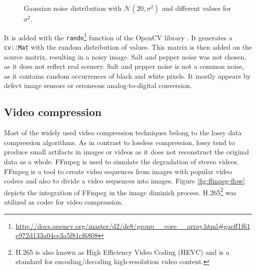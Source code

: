 \begin{figure}[h!]
  \center
  \caption{Gaussian noise distribution with $\mathcal{N}(20,\sigma^2)$ and different values for $\sigma^2$.}
  \label{fig:gaussian}
\end{figure}

\noindent It is added with the \texttt{randn}\footnote{\url{http://docs.opencv.org/master/d2/de8/group__core__array.html\#gaeff1f61e972d133a04ce3a5f81cf6808}} function of the OpenCV library \citep{opencv_library}.
It generates a \texttt{cv::Mat} with the random distribution of values.
This matrix is then added on the source matrix, resulting in a noisy image.
Salt and pepper noise was not chosen, as it does not reflect real scenery.
Salt and pepper noise is not a common noise, as it contains random occurrences of black and white pixels.
It mostly appears by defect image sensors or erroneous analog-to-digital conversion.

\subsection*{Video compression}

Most of the widely used video compression techniques belong to the lossy data compression algorithms.
As in contrast to lossless compression, lossy tend to produce small artifacts in images or videos as it does not reconstruct the original data as a whole.
FFmpeg \citep{FFMPEG2010} is used to simulate the degradation of stereo videos.
FFmpeg is a tool to create video sequences from images with popular video codecs and also to divide a video sequences into images.
Figure \ref{fig:ffmpeg-flow} depicts the integration of FFmpeg in the image diminish process.
\newline\newline\noindent H.265\footnote{H.265 is also known as High Efficiency Video Coding (HEVC) and is a standard for encoding/decoding high-resolution video content.} was utilized as codec for video compression.

